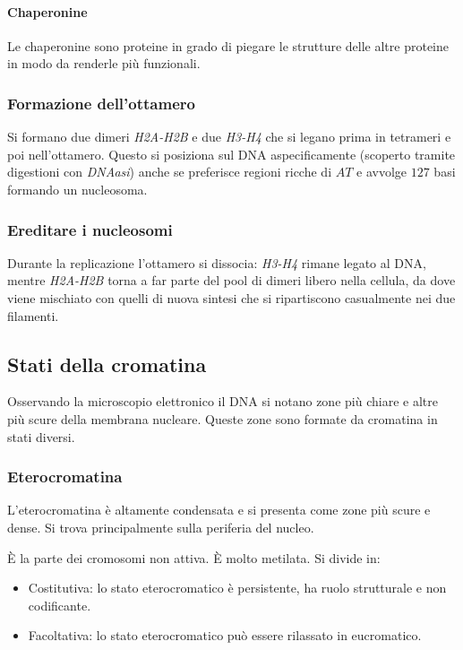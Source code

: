 			\paragraph{Chaperonine}
			Le chaperonine sono proteine in grado di piegare le strutture delle altre proteine in modo da renderle pi\`u funzionali.

		\subsubsection{Formazione dell'ottamero}
		Si formano due dimeri \emph{H2A-H2B} e due \emph{H3-H4} che si legano prima in tetrameri e poi nell'ottamero.
		Questo si posiziona sul DNA aspecificamente (scoperto tramite digestioni con \emph{DNAasi}) anche se preferisce regioni ricche di $AT$ e avvolge $127$ basi formando un nucleosoma.

		\subsubsection{Ereditare i nucleosomi}
		Durante la replicazione l'ottamero si dissocia: \emph{H3-H4} rimane legato al DNA, mentre \emph{H2A-H2B} torna a far parte del pool di dimeri libero nella cellula, da dove viene mischiato
		con quelli di nuova sintesi che si ripartiscono casualmente nei due filamenti.

	\subsection{Stati della cromatina}
	Osservando la microscopio elettronico il DNA si notano zone pi\`u chiare e altre pi\`u scure della membrana nucleare.
	Queste zone sono formate da cromatina in stati diversi.

		\subsubsection{Eterocromatina}
		L'eterocromatina \`e altamente condensata e si presenta come zone pi\`u scure e dense.
		Si trova principalmente sulla periferia del nucleo. 

		\`E la parte dei cromosomi non attiva.
		\`E molto metilata.
		Si divide in:
		\begin{multicols}{2}
			\begin{itemize}
				\item Costitutiva: lo stato eterocromatico \`e persistente, ha ruolo strutturale e non codificante.
				\item Facoltativa: lo stato eterocromatico pu\`o essere rilassato in eucromatico.
			\end{itemize}
		\end{multicols}

